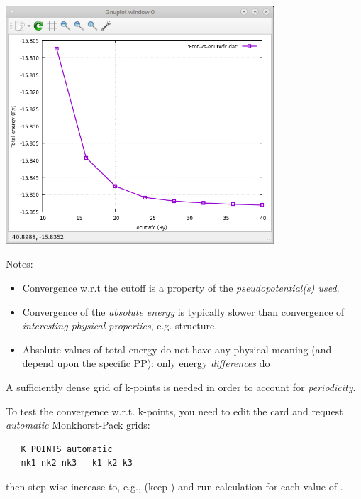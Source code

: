 \documentclass[landscape]{foils}
\begin{document}
%
\begin{center}
\includegraphics[width=10cm]{figs/ecut.png}
\end{center}
\vspace{-2cm}
{\burgundy Notes:}
\begin{itemize}
\item Convergence w.r.t the cutoff is a property of the {\em pseudopotential(s) used}.
\item 
Convergence of the {\em absolute energy} is typically slower than convergence of
{\em interesting physical properties}, e.g. structure.
\item 
Absolute values of total energy do not have any physical meaning 
(and depend upon the specific PP): only energy {\em differences} do
\end{itemize}

%
A sufficiently dense grid of k-points is needed in order to account
for {\em periodicity}.

To test the convergence w.r.t. k-points, you need to edit
the  card and request {\em automatic} Monkhorst-Pack
grids:
%
{\cardcolor
\begin{verbatim}
   K_POINTS automatic
   nk1 nk2 nk3   k1 k2 k3
\end{verbatim}
}
then step-wise increase  to, e.g., 
(keep ) and run  calculation for each
value of .
\end{document}
